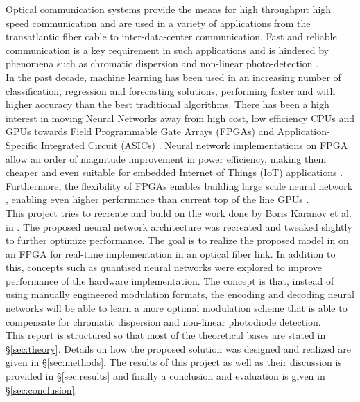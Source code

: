Optical communication systems provide the means for high throughput high speed communication and are used in a variety of applications from the transatlantic fiber cable to inter-data-center communication. Fast and reliable communication is a key requirement in such applications and is hindered by phenomena such as chromatic dispersion and non-linear photo-detection \autocite{8433895}.
\\

In the past decade, machine learning has been used in an increasing number of classification, regression and forecasting solutions, performing faster and with higher accuracy than the best traditional algorithms. There has been a high interest in moving Neural Networks away from high cost, low efficiency CPUs and GPUs towards Field Programmable Gate Arrays (FPGAs) and Application-Specific Integrated Circuit (ASICs) \autocite{7929192}. Neural network implementations on FPGA allow an order of magnitude improvement in power efficiency, making them cheaper and even suitable for embedded Internet of Things (IoT) applications \autocite{7799795,8954866,8469659,8330546,8693488}. Furthermore, the flexibility of FPGAs enables building large scale neural network \autocite{8823487,7045812}, enabling even higher performance than current top of the line GPUs \autocite{8702332,8412552}. 
\\

This project tries to recreate and build on the work done by Boris Karanov et al. in \autocite{8433895}. The proposed neural network architecture was recreated and tweaked slightly to further optimize performance. The goal is to realize the proposed model in \autocite{8433895} on an FPGA for real-time implementation in an optical fiber link. In addition to this, concepts such as quantised neural networks were explored to improve performance of the hardware implementation. The concept is that, instead of using manually engineered modulation formats, the encoding and decoding neural networks will be able to learn a more optimal modulation scheme that is able to compensate for chromatic dispersion and non-linear photodiode detection.
\\

This report is structured so that most of the theoretical bases are stated in \S \ref{sec:theory}. Details on how the proposed solution was designed and realized are given in \S \ref{sec:methods}. The results of this project as well as their discussion is provided in \S \ref{sec:results} and finally a conclusion and evaluation is given in \S \ref{sec:conclusion}.
